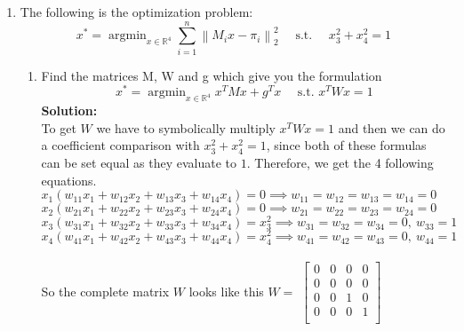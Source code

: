 \documentclass{article}
\numberwithin{equation}{section}
\newcommand{\0}{\mathbf{0}}
\begin{document}
\begin{enumerate}
\begin{enumerate}
	 	\end{enumerate}
 		
 		\item The following is the optimization problem:
 		\[ 
 		x^{*}=\operatorname{argmin}_{x \in \mathbb{R}^{4}} \sum_{i=1}^{n}\left\|M_{i} x-\pi_{i}\right\|_{2}^{2} \quad \text { s.t. } \quad x_{3}^{2}+x_{4}^{2}=1
 		\] 
 		\begin{enumerate}
		\item Find the matrices M, W and g which give you the formulation 
		\[
		 x^{*}=\operatorname{argmin}_{x \in \mathbb{R}^{4}} x^{T} M x+g^{T} x 
		\quad \text { s.t. } x^{T} W x=1
		\]
 		\textbf{Solution:} \\
 		To get $W$ we have to symbolically multiply $x^T   W   x = 1$ and then we can do a coefficient comparison with $x^2_3+x^2_4 = 1$, since both of these formulas can be set equal as they evaluate to $1$.
 		Therefore, we get the 4 following equations. \\ \newline
 		$ x_1   (w_{11}   x_1 + w_{12}   x_2 + w_{13}   x_3 + w_{14}   x_4) = 0 \implies w_{11} = w_{12} = w_{13} = w_{14} = 0$ \\ \newline
		$ x_2   (w_{21}   x_1 + w_{22}   x_2 + w_{23}   x_3 + w_{24}   x_4) = 0 \implies w_{21} = w_{22} = w_{23} = w_{24} = 0$ \\ \newline
		$ x_3   (w_{31}   x_1 + w_{32}   x_2 + w_{33}   x_3 + w_{34}   x_4) = x_3^2 \implies w_{31} = w_{32} = w_{34} = 0,\ w_{33} = 1$ \\ \newline
		$ x_4   (w_{41}   x_1 + w_{42}   x_2 + w_{43}   x_3 + w_{44}   x_4) = x_4^2 \implies w_{41} = w_{42} = w_{43} = 0,\ w_{44} = 1$ \\ \newline
		\\		
		So the complete matrix $W$ looks like this
		\newline \newline
		$W = $ 
		$\begin{bmatrix} 
		0 & 0& 0 & 0 \\
		0 & 0& 0 & 0 \\
		0 & 0& 1 & 0 \\
		0 & 0& 0 & 1 \\
		\end{bmatrix}$
		\newline \newline
		

\end{enumerate}
\end{enumerate}
\end{document}
